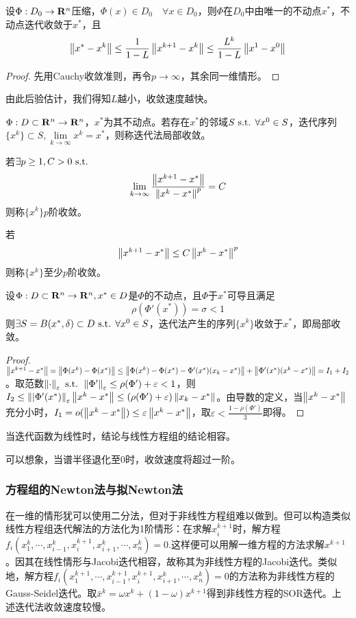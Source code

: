 \documentclass{ctexart}
\begin{document}
\begin{Thm}
设$\Phi:D_0\to \mathbf{R}^n$压缩，$\Phi(x)\in D_0\quad \forall x\in D_0$，则$\Phi$在$D_0$中由唯一的不动点$x^*$，不动点迭代收敛于$x^*$，且
\[\left\|x^*-x^k \right\|\leq \frac{1}{1-L}\left\|x^{k+1}-x^k \right\|\leq \frac{L^k}{1-L}\left\|x^1-x^0 \right\|\]
\end{Thm}

\begin{proof}
先用Cauchy收敛准则，再令$p\to\infty$，其余同一维情形。
\end{proof}

由此后验估计，我们得知$L$越小，收敛速度越快。

\begin{Def}
$\Phi :D\subset \mathbf{R}^n \to\mathbf{R}^n$，$x^*$为其不动点。若存在$x^*$的邻域$S\text{ s.t. }\forall x^0\in S$，迭代序列$\{x^k\}\subset S,\lim\limits_{k\to\infty}x^k=x^*$，则称迭代法局部收敛。

若$\exists p\geq 1,C>0\text{ s.t. }$
\[\lim_{k\to\infty}\frac{\left\|x^{k+1}-x^* \right\|}{\left\|x^k-x^* \right\|^p}=C\]
则称$\{x^k\} p$阶收敛。

若
\[\left\|x^{k+1}-x^* \right\|\leq C\left\|x^k-x^* \right\|^p\]
则称$\{x^{k}\}$至少$p$阶收敛。
\end{Def}

\begin{Thm}
设$\Phi:D\subset \mathbf{R}^n\to\mathbf{R}^n,x^*\in D$是$\Phi$的不动点，且$\Phi$于$x^*$可导且满足
\[\rho(\Phi'(x^*))=\sigma<1\]
则$\exists S=B(x^*,\delta)\subset D\text{ s.t. }\forall x^0\in S$，迭代法产生的序列$\{x^k\}$收敛于$x^*$，即局部收敛。
\end{Thm}

\begin{proof}
$\left\|x^{k+1}-x^* \right\|=\left\|\Phi(x^k)-\Phi(x^*) \right\|\leq \left\|\Phi(x^k)-\Phi(x^*)-\Phi'(x^*)(x_k-x^*) \right\|+\left\|\Phi'(x^*)(x^k-x^*) \right\|=I_1+I_2$。取范数$\left\|\cdot \right\|_\varepsilon\text{ s.t. } \left\|\Phi' \right\|_{\varepsilon}\leq \rho(\Phi')+\varepsilon<1$，则$I_2\leq \left\||\Phi'(x^*) \right\|_{\varepsilon}\left\|x^k-x^* \right\|\leq (\rho(\Phi')+\varepsilon)\left\|x_k-x^* \right\|$。由导数的定义，当$\left\|x^k-x^* \right\|$充分小时，$I_1=o(\left\|x^k-x^* \right\|)\leq \varepsilon\left\|x^k-x^* \right\|$，取$\varepsilon<\frac{1-\rho(\Phi')}{3}$即得。
\end{proof}

当迭代函数为线性时，结论与线性方程组的结论相容。

可以想象，当谱半径退化至$0$时，收敛速度将超过一阶。

\subsubsection{方程组的Newton法与拟Newton法}
在一维的情形犹可以使用二分法，但对于非线性方程组难以做到。但可以构造类似线性方程组迭代解法的方法化为1阶情形：在求解$x_i^{k+1}$时，解方程$f_i(x_1^k,\cdots,x_{i-1}^k,x_i^{k+1},x_{i+1}^k,\cdots,x_n^k)=0$.这样便可以用解一维方程的方法求解$x^{k+1}$。因其在线性情形与Jacobi迭代相容，故称其为非线性方程的Jacobi迭代。类似地，解方程$f_i(x_1^{k+1},\cdots,x_{i-1}^{k+1},x_i^{k+1},x_{i+1}^k,\cdots,x_n^k)=0$的方法称为非线性方程的Gauss-Seidel迭代。取$\bar{x}^k=\omega x^k+(1-\omega)x^{k+1}$得到非线性方程的SOR迭代。上述迭代法收敛速度较慢。
\end{document}
